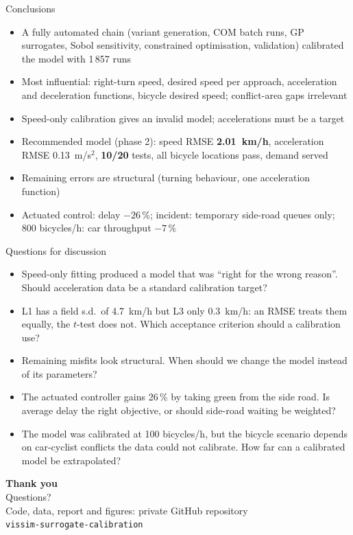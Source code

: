 \documentclass[aspectratio=169,10pt]{beamer}
\newcommand{\hl}[1]{\textcolor{accent}{\textbf{#1}}}
\begin{document}
\begin{frame}{Conclusions}
\small
\begin{itemize}\setlength{\itemsep}{5pt}
  \item A fully automated chain (variant generation, COM batch runs, GP surrogates, Sobol
        sensitivity, constrained optimisation, validation) calibrated the model with 1\,857 runs
  \item Most influential: right-turn speed, desired speed per approach, acceleration and
        deceleration functions, bicycle desired speed; conflict-area gaps irrelevant
  \item Speed-only calibration gives an invalid model; accelerations must be a target
  \item Recommended model (phase 2): speed RMSE \hl{2.01~km/h}, acceleration RMSE 0.13~m/s$^2$,
        \hl{10/20} tests, all bicycle locations pass, demand served
  \item Remaining errors are structural (turning behaviour, one acceleration function)
  \item Actuated control: delay \hl{$-26\,\%$}; incident: temporary side-road queues only;
        800 bicycles/h: car throughput $-7\,\%$
\end{itemize}
\end{frame}

\begin{frame}{Questions for discussion}
\small
\begin{itemize}\setlength{\itemsep}{6pt}
  \item Speed-only fitting produced a model that was ``right for the wrong reason''. Should
        acceleration data be a standard calibration target?
  \item L1 has a field s.d.\ of 4.7~km/h but L3 only 0.3~km/h: an RMSE treats them equally, the
        $t$-test does not. Which acceptance criterion should a calibration use?
  \item Remaining misfits look structural. When should we change the model instead of its
        parameters?
  \item The actuated controller gains 26\,\% by taking green from the side road. Is average delay
        the right objective, or should side-road waiting be weighted?
  \item The model was calibrated at 100 bicycles/h, but the bicycle scenario depends on
        car-cyclist conflicts the data could not calibrate. How far can a calibrated model be
        extrapolated?
\end{itemize}
\end{frame}

\begin{frame}[plain]
\centering
\vfill
{\color{accent}\Huge\bfseries Thank you}\\[10pt]
{\large Questions?}\\[18pt]
\small Code, data, report and figures: private GitHub repository\\[2pt]
\texttt{vissim-surrogate-calibration}
\vfill
\end{frame}
\end{document}
